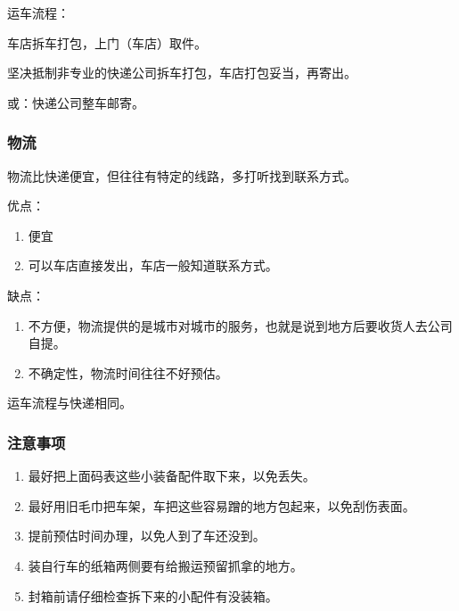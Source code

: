 \documentclass{ctexbook}
\begin{document}
运车流程：

车店拆车打包，上门（车店）取件。

坚决抵制非专业的快递公司拆车打包，车店打包妥当，再寄出。

或：快递公司整车邮寄。
\subsubsection{物流}
物流比快递便宜，但往往有特定的线路，多打听找到联系方式。

优点：
\begin{enumerate}
    \item 便宜
    \item 可以车店直接发出，车店一般知道联系方式。
\end{enumerate}

缺点：
\begin{enumerate}
    \item 不方便，物流提供的是城市对城市的服务，也就是说到地方后要收货人去公司自提。
    \item 不确定性，物流时间往往不好预估。
\end{enumerate}
运车流程与快递相同。
\subsubsection{注意事项}
\begin{enumerate}
    \item 最好把上面码表这些小装备配件取下来，以免丢失。
    \item 最好用旧毛巾把车架，车把这些容易蹭的地方包起来，以免刮伤表面。
    \item 提前预估时间办理，以免人到了车还没到。
    \item 装自行车的纸箱两侧要有给搬运预留抓拿的地方。
    \item 封箱前请仔细检查拆下来的小配件有没装箱。
\end{enumerate}
\end{document}
